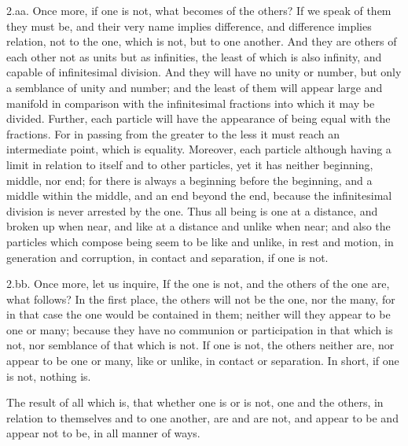 \documentclass[11pt,letter]{article}
\begin{document}
\par  2.aa. Once more, if one is not, what becomes of the others? If we speak of them they must be, and their very name implies difference, and difference implies relation, not to the one, which is not, but to one another. And they are others of each other not as units but as infinities, the least of which is also infinity, and capable of infinitesimal division. And they will have no unity or number, but only a semblance of unity and number; and the least of them will appear large and manifold in comparison with the infinitesimal fractions into which it may be divided. Further, each particle will have the appearance of being equal with the fractions. For in passing from the greater to the less it must reach an intermediate point, which is equality. Moreover, each particle although having a limit in relation to itself and to other particles, yet it has neither beginning, middle, nor end; for there is always a beginning before the beginning, and a middle within the middle, and an end beyond the end, because the infinitesimal division is never arrested by the one. Thus all being is one at a distance, and broken up when near, and like at a distance and unlike when near; and also the particles which compose being seem to be like and unlike, in rest and motion, in generation and corruption, in contact and separation, if one is not.

\par  2.bb. Once more, let us inquire, If the one is not, and the others of the one are, what follows? In the first place, the others will not be the one, nor the many, for in that case the one would be contained in them; neither will they appear to be one or many; because they have no communion or participation in that which is not, nor semblance of that which is not. If one is not, the others neither are, nor appear to be one or many, like or unlike, in contact or separation. In short, if one is not, nothing is.

\par  The result of all which is, that whether one is or is not, one and the others, in relation to themselves and to one another, are and are not, and appear to be and appear not to be, in all manner of ways.
\end{document}
